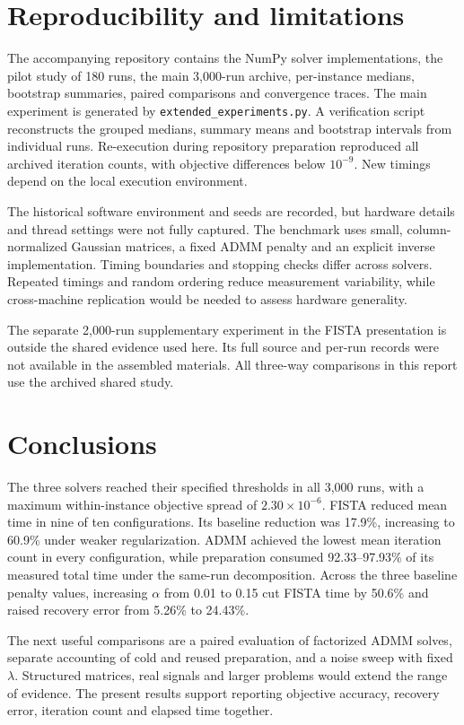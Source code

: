 \documentclass{article}
\begin{document}
\section{Reproducibility and limitations}
The accompanying repository contains the NumPy solver implementations, the pilot study of 180 runs, the main 3,000-run archive, per-instance medians, bootstrap summaries, paired comparisons and convergence traces. The main experiment is generated by \texttt{extended\_experiments.py}. A verification script reconstructs the grouped medians, summary means and bootstrap intervals from individual runs. Re-execution during repository preparation reproduced all archived iteration counts, with objective differences below $10^{-9}$. New timings depend on the local execution environment.

The historical software environment and seeds are recorded, but hardware details and thread settings were not fully captured. The benchmark uses small, column-normalized Gaussian matrices, a fixed ADMM penalty and an explicit inverse implementation. Timing boundaries and stopping checks differ across solvers. Repeated timings and random ordering reduce measurement variability, while cross-machine replication would be needed to assess hardware generality.

The separate 2,000-run supplementary experiment in the FISTA presentation is outside the shared evidence used here. Its full source and per-run records were not available in the assembled materials. All three-way comparisons in this report use the archived shared study.

\section{Conclusions}
The three solvers reached their specified thresholds in all 3,000 runs, with a maximum within-instance objective spread of $2.30\times10^{-6}$. FISTA reduced mean time in nine of ten configurations. Its baseline reduction was 17.9\%, increasing to 60.9\% under weaker regularization. ADMM achieved the lowest mean iteration count in every configuration, while preparation consumed 92.33--97.93\% of its measured total time under the same-run decomposition. Across the three baseline penalty values, increasing $\alpha$ from 0.01 to 0.15 cut FISTA time by 50.6\% and raised recovery error from 5.26\% to 24.43\%.

The next useful comparisons are a paired evaluation of factorized ADMM solves, separate accounting of cold and reused preparation, and a noise sweep with fixed $\lambda$. Structured matrices, real signals and larger problems would extend the range of evidence. The present results support reporting objective accuracy, recovery error, iteration count and elapsed time together.
\end{document}
